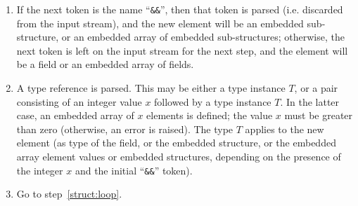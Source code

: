 \begin{enumerate}
    \item If the next token is the name ``\verb|&&|'', then that token
    is parsed (i.e. discarded from the input stream), and the new
    element will be an embedded sub-structure, or an embedded array of
    embedded sub-structures; otherwise, the next token is left on the
    input stream for the next step, and the element will be a field or
    an embedded array of fields.

    \item A type reference is parsed. This may be either a type instance
    $T$, or a pair consisting of an integer value $x$ followed by a type
    instance $T$. In the latter case, an embedded array of $x$ elements
    is defined; the value $x$ must be greater than zero (otherwise, an
    error is raised). The type $T$ applies to the new element (as type
    of the field, or the embedded structure, or the embedded array
    element values or embedded structures, depending on the presence of
    the integer $x$ and the initial ``\verb|&&|'' token).

    \item Go to step~\ref{struct:loop}.

\end{enumerate}

